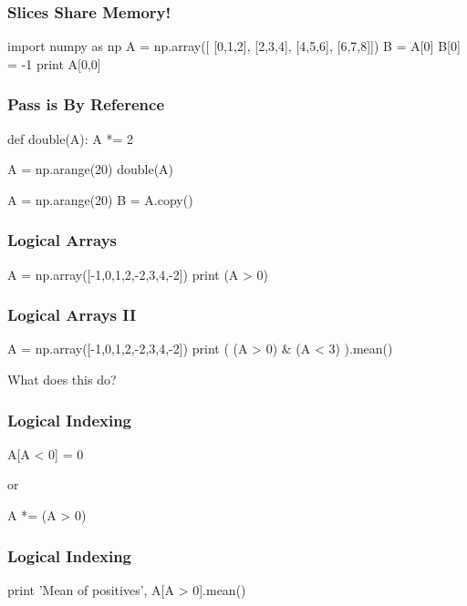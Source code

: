 \begin{frame}[fragile]
\frametitle{Slices Share Memory!}
\begin{python}
import numpy as np
A = np.array([
    [0,1,2],
    [2,3,4],
    [4,5,6],
    [6,7,8]])
B = A[0]
B[0] = -1
print A[0,0]
\end{python}

\end{frame}

\begin{frame}[fragile]
\frametitle{Pass is By Reference}

\begin{python}
def double(A):
    A *= 2

A = np.arange(20)
double(A)
\end{python}
\pause
\begin{python}
A = np.arange(20)
B = A.copy()
\end{python}
\end{frame}

\begin{frame}[fragile]
\frametitle{Logical Arrays}
\begin{python}
A = np.array([-1,0,1,2,-2,3,4,-2])
print (A > 0)
\end{python}
\end{frame}
\begin{frame}[fragile]
\frametitle{Logical Arrays II}
\begin{python}
A = np.array([-1,0,1,2,-2,3,4,-2])
print ( (A > 0) & (A < 3) ).mean()
\end{python}

What does this do?
\end{frame}

\begin{frame}[fragile]
\frametitle{Logical Indexing}
\begin{python}
A[A < 0] = 0
\end{python}
or
\begin{python}
A *= (A > 0)
\end{python}
\end{frame}


\begin{frame}[fragile]
\frametitle{Logical Indexing}

\begin{python}
print 'Mean of positives', A[A > 0].mean()
\end{python}
\end{frame}


